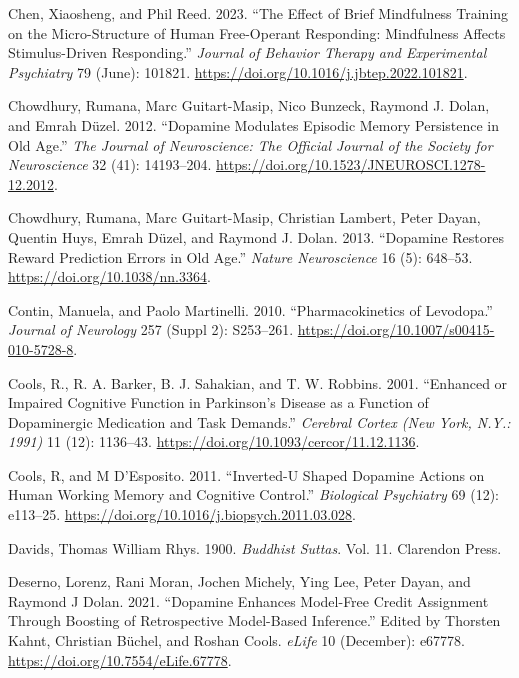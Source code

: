 \documentclass{article}
\newlength{\cslhangindent}
\newlength{\cslentryspacingunit} %
\newenvironment{CSLReferences}[2] %
 {%
  \setlength{\parindent}{0pt}
  \ifodd #1
  \let\oldpar\par
  \def\par{\hangindent=\cslhangindent\oldpar}
  \fi
  \setlength{\parskip}{#2\cslentryspacingunit}
 }%
 {}
\begin{document}
\begin{CSLReferences}{1}{0}
\leavevmode{}%
Chen, Xiaosheng, and Phil Reed. 2023. {``The Effect of Brief Mindfulness
Training on the Micro-Structure of Human Free-Operant Responding:
{Mindfulness} Affects Stimulus-Driven Responding.''} \emph{Journal of
Behavior Therapy and Experimental Psychiatry} 79 (June): 101821.
\url{https://doi.org/10.1016/j.jbtep.2022.101821}.

\leavevmode{}%
Chowdhury, Rumana, Marc Guitart-Masip, Nico Bunzeck, Raymond J. Dolan,
and Emrah Düzel. 2012. {``Dopamine Modulates Episodic Memory Persistence
in Old Age.''} \emph{The Journal of Neuroscience: The Official Journal
of the Society for Neuroscience} 32 (41): 14193--204.
\url{https://doi.org/10.1523/JNEUROSCI.1278-12.2012}.

\leavevmode{}%
Chowdhury, Rumana, Marc Guitart-Masip, Christian Lambert, Peter Dayan,
Quentin Huys, Emrah Düzel, and Raymond J. Dolan. 2013. {``Dopamine
Restores Reward Prediction Errors in Old Age.''} \emph{Nature
Neuroscience} 16 (5): 648--53. \url{https://doi.org/10.1038/nn.3364}.

\leavevmode{}%
Contin, Manuela, and Paolo Martinelli. 2010. {``Pharmacokinetics of
Levodopa.''} \emph{Journal of Neurology} 257 (Suppl 2): S253--261.
\url{https://doi.org/10.1007/s00415-010-5728-8}.

\leavevmode{}%
Cools, R., R. A. Barker, B. J. Sahakian, and T. W. Robbins. 2001.
{``Enhanced or Impaired Cognitive Function in {Parkinson}'s Disease as a
Function of Dopaminergic Medication and Task Demands.''} \emph{Cerebral
Cortex (New York, N.Y.: 1991)} 11 (12): 1136--43.
\url{https://doi.org/10.1093/cercor/11.12.1136}.

\leavevmode{}%
Cools, R, and M D'Esposito. 2011. {``Inverted-{U} Shaped Dopamine
Actions on Human Working Memory and Cognitive Control.''}
\emph{Biological Psychiatry} 69 (12): e113--25.
\url{https://doi.org/10.1016/j.biopsych.2011.03.028}.

\leavevmode{}%
Davids, Thomas William Rhys. 1900. \emph{Buddhist Suttas}. Vol. 11.
{Clarendon Press}.

\leavevmode{}%
Deserno, Lorenz, Rani Moran, Jochen Michely, Ying Lee, Peter Dayan, and
Raymond J Dolan. 2021. {``Dopamine Enhances Model-Free Credit Assignment
Through Boosting of Retrospective Model-Based Inference.''} Edited by
Thorsten Kahnt, Christian Büchel, and Roshan Cools. \emph{eLife} 10
(December): e67778. \url{https://doi.org/10.7554/eLife.67778}.


\end{CSLReferences}
\end{document}
